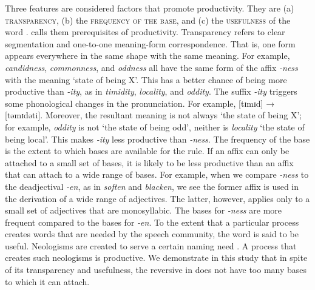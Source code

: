 \documentclass[output=paper]{langsci/langscibook}
\begin{document}
Three features are considered factors that promote productivity. They are (a) \textsc{transparency}, (b) the \textsc{frequency of the base}, and (c) the \textsc{usefulness} of the word \citep{Bauer2001,Lieber2009}. \citet{Bauer2001} calls them prerequisites of productivity. Transparency refers to clear segmentation and one-to-one meaning-form correspondence. That is, one form appears everywhere in the same shape with the same meaning. For example, \textit{candidness}, \textit{commonness}, and \textit{oddness} all have the same form of the affix \textit{-ness} with the meaning ‘state of being X’. This has a better chance of being more productive than \textit{-ity}, as in \textit{timidity}, \textit{locality}, and \textit{oddity}. The suffix \textit{-ity} triggers some phonological changes in the pronunciation. For example, [tɪmɪd] → [təmɪdəti]. Moreover, the resultant meaning is not always ‘the state of being X’; for example, \textit{oddity} is not ‘the state of being odd’, neither is \textit{locality} ‘the state of being local’. This makes \textit{-ity} less productive than \textit{-ness}. The frequency of the base is the extent to which bases are available for the rule. If an affix can only be attached to a small set of bases, it is likely to be less productive than an affix that can attach to a wide range of bases. For example, when we compare \textit{-ness} to the deadjectival \textit{-en}, as in \textit{soften} and \textit{blacken}, we see the former affix is used in the derivation of a wide range of adjectives. The latter, however, applies only to a small set of adjectives that are monosyllabic. The bases for \textit{-ness} are more frequent compared to the bases for \textit{-en}. To the extent that a particular process creates words that are needed by the speech community, the word is said to be useful. Neologisms are created to serve a certain naming need \citep{Stekauer2005}. A process that creates such neologisms is productive. We demonstrate in this study that in spite of its transparency and usefulness, the reversive in  does not have too many bases to which it can attach. 
\end{document}
